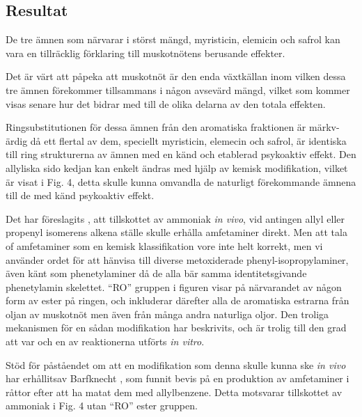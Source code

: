 \documentclass[a4paper,margin=3.25cm]{article}
\begin{document}
{%

	\subsection{Resultat}

	De tre ämnen som närvarar i störst mängd, myristicin, elemicin och safrol kan vara en tillräcklig förklaring till muskotnötens berusande effekter.

	Det är värt att påpeka att muskotnöt är den enda växtkällan inom vilken dessa tre ämnen förekommer tillsammans i någon avsevärd mängd, vilket som kommer visas senare hur det bidrar med till de olika delarna av den totala effekten.

	Ringsubstitutionen för dessa ämnen från den aromatiska fraktionen är märkv-ärdig då ett flertal av dem, speciellt myristicin, elemecin och safrol, är identiska till ring strukturerna av ämnen med en känd och etablerad psykoaktiv effekt. Den allyliska sido kedjan kan enkelt ändras med hjälp av kemisk modifikation, vilket är visat i Fig. 4, detta skulle kunna omvandla de naturligt förekommande ämnena till de med känd psykoaktiv effekt.

	Det har föreslagits \cite{shulgin1967chemistry}, att tillskottet av ammoniak \textit{in vivo}, vid antingen allyl eller propenyl isomerens alkena ställe skulle erhålla amfetaminer direkt.
	Men att tala of amfetaminer som en kemisk klassifikation vore inte helt korrekt, men vi använder ordet för att hänvisa till diverse metoxiderade phenyl-isopropylaminer, även känt som phenetylaminer då de alla bär samma identitetsgivande phenetylamin skelettet.
	``RO'' gruppen i figuren visar på närvarandet av någon form av ester på ringen,	och inkluderar därefter alla de aromatiska estrarna från oljan av muskotnöt men även
	från många andra naturliga oljor.
	Den troliga mekanismen för en sådan  modifikation har beskrivits,
	och är trolig till den grad att var och en av reaktionerna utförts \textit{in vitro}.

	Stöd för påståendet om att en modifikation som denna skulle kunna ske \textit{in vivo} har erhållitsav Barfknecht \cite{shulgin1967chemistry}, som funnit bevis på en produktion av amfetaminer i råttor
	efter att ha matat dem med allylbenzene. Detta motsvarar tillskottet av
	ammoniak i Fig. 4 utan ``RO'' ester gruppen.




}
\end{document}
